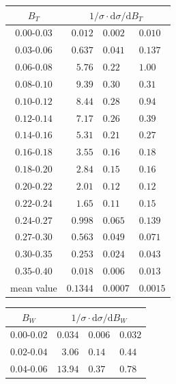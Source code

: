 \documentclass[12pt,a4paper,twoside]{article}
\begin{document}
\begin{table}[!htb]
\begin{center}
\vspace*{5mm}
%
%
\begin{tabular}{|c||r@{ $\pm$ }l@{ $\pm$ }l|}   
\hline
$B_T$           & 
      \multicolumn{3}{c|}{$1/\sigma \cdot {\mathrm{d}}\sigma/{\mathrm{d}}B_T$} \\
\hline\hline
$ 0.00 $-$0.03  $&$   0.012 $&$     0.002 $&$     0.010   $\\
$ 0.03 $-$0.06  $&$   0.637 $&$     0.041 $&$     0.137   $\\
$ 0.06 $-$0.08  $&$   5.76  $&$     0.22  $&$     1.00    $\\
$ 0.08 $-$0.10  $&$   9.39  $&$     0.30  $&$     0.31    $\\
$ 0.10 $-$0.12  $&$   8.44  $&$     0.28  $&$     0.94    $\\
$ 0.12 $-$0.14  $&$   7.17  $&$     0.26  $&$     0.39    $\\
$ 0.14 $-$0.16  $&$   5.31  $&$     0.21  $&$     0.27    $\\
$ 0.16 $-$0.18  $&$   3.55  $&$     0.16  $&$     0.18    $\\
$ 0.18 $-$0.20  $&$   2.84  $&$     0.15  $&$     0.16    $\\
$ 0.20 $-$0.22  $&$   2.01  $&$     0.12  $&$     0.12    $\\
$ 0.22 $-$0.24  $&$   1.65  $&$     0.11  $&$     0.15    $\\
$ 0.24 $-$0.27  $&$   0.998 $&$     0.065 $&$     0.139   $\\
$ 0.27 $-$0.30  $&$   0.563 $&$     0.049 $&$     0.071   $\\
$ 0.30 $-$0.35  $&$   0.253 $&$     0.024 $&$     0.043   $\\
$ 0.35 $-$0.40  $&$   0.018 $&$     0.006 $&$     0.013   $\\
\hline\hline
mean value       &$  0.1344 $&$     0.0007 $&$    0.0015 $\\
\hline
\end{tabular}
%
%
\begin{tabular}{|c||r@{ $\pm$ }l@{ $\pm$ }l|}   
\hline
$B_W$           & 
      \multicolumn{3}{c|}{$1/\sigma \cdot {\mathrm{d}}\sigma/{\mathrm{d}}B_W$} \\
\hline\hline
$ 0.00 $-$0.02  $&$   0.034 $&$     0.006 $&$     0.032   $\\
$ 0.02 $-$0.04  $&$   3.06  $&$     0.14  $&$     0.44    $\\
$ 0.04 $-$0.06  $&$  13.94  $&$     0.37  $&$     0.78    $\\

\end{tabular}
\end{center}
\end{table}
\end{document}
